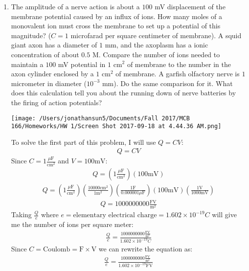 \documentclass[11pt]{article}
\begin{document}
\begin{enumerate}[label=\arabic*.]
\newpage
\item
The amplitude of a nerve action is about a $100$ mV displacement of the membrane potential caused by an influx of  ions. How many moles of a monovalent ion must cross the membrane to set up a potential of this magnitude? ($C = 1$ microfarad per square centimeter of membrane). A squid giant axon has a diameter of $1$ mm, and the axoplasm has a ionic concentration of about $0.5$ M. Compare the number of ions needed to maintain a $100$ mV potential in $1$ cm$^2$ of membrane to the number in the axon cylinder enclosed by a $1$ cm$^2$ of membrane. A garfish olfactory nerve is $1$ micrometer in diameter ($10^{-3}$ mm). Do the same comparison for it. What does this calculation tell you about the running down of nerve batteries by the firing of action potentials?
\begin{center}
\texttt{[image: /Users/jonathansun5/Documents/Fall 2017/MCB 166/Homeworks/HW 1/Screen Shot 2017-09-18 at 4.44.36 AM.png]}
\end{center}
To solve the first part of this problem, I will use $Q = C V$:
\begin{align*}
Q = C V
\end{align*}
Since $C = 1 \frac{\mu \text{F}} {\text{cm}^2}$ and $V = 100 \text{mV}$:
\begin{align*}
Q = \left(1 \frac{\mu \text{F}} {\text{cm}^2}\right) \left(100 \text{mV}\right)
\end{align*}
\begin{align*}
Q = \left(1 \frac{\mu \text{F}} {\text{cm}^2}\right) \left(\frac{10000 \text{cm}^2} {1 \text{m}^2}\right) \left(\frac{1\text{F}} {0.000001 \mu \text{F}}\right) \left(100 \text{mV}\right) \left(\frac{1\text{V}} {1000\text{mV}}\right)
\end{align*}
\begin{align*}
Q = 1000000000 \frac{\text{FV}} {\text{m}^2}
\end{align*}
Taking $\frac{Q} {e}$ where $e = \text{elementary electrical charge} = 1.602 \times 10^{-19} C$ will give me the number of ions per square meter:
\begin{align*}
\frac{Q} {e} = \frac{1000000000 \frac{\text{FV}} {\text{m}^2}} {1.602 \times 10^{-19} C}
\end{align*}
Since $C = \text{Coulomb} = \text{F} \times \text{V}$ we can rewrite the equation as:
\begin{align*}
\frac{Q} {e} = \frac{1000000000 \frac{\text{FV}} {\text{m}^2}} {1.602 \times 10^{-19} \text{FV}}
\end{align*}

\end{enumerate}
\end{document}
